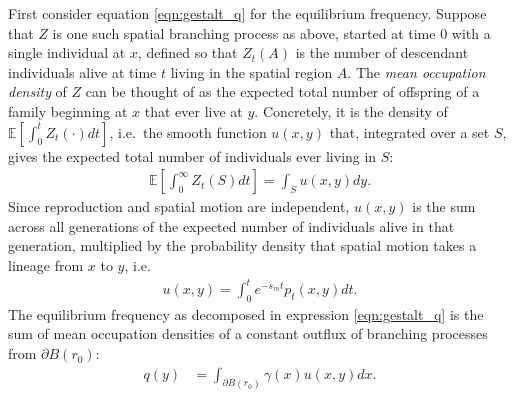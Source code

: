 \documentclass{article}
\newcommand{\E}{\mathbb{E}}
\begin{document}
First consider equation \eqref{eqn:gestalt_q} for the equilibrium frequency.
Suppose that $Z$ is one such spatial branching process as above, started at time 0 with a single individual at $x$,
defined so that $Z_t(A)$ is the number of descendant individuals alive at time $t$ living in the spatial region $A$.
The \emph{mean occupation density} of $Z$ can be thought of 
as the expected total number of offspring of a family beginning at $x$ that ever live at $y$.
Concretely, it is the density of $\E[\int_0^t Z_t(\cdot) dt]$,
i.e.\ the smooth function $u(x,y)$ that, integrated over a set $S$, 
gives the expected total number of individuals ever living in $S$:
\begin{align} \label{eqn:occupation_density_defn}
    \E\left[ \int_0^\infty Z_t(S) dt \right] = \int_S u(x,y) dy .
\end{align}
Since reproduction and spatial motion are independent,
$u(x,y)$ is the sum across all generations of the expected number of individuals alive in that generation,
multiplied by the probability density that spatial motion takes a lineage from $x$ to $y$,
i.e.\
\begin{align}
    u(x,y) = \int_0^t e^{-s_m t} p_t(x,y) dt .
\end{align}
The equilibrium frequency as decomposed in expression \eqref{eqn:gestalt_q} 
is the sum of mean occupation densities of a constant outflux of branching processes
from $\partial B(r_0)$:
\begin{align} \label{eqn:occupation_integral}
    q(y) &= \int_{\partial B(r_0)} \gamma(x) u(x,y) dx  . %
\end{align}
\end{document}
